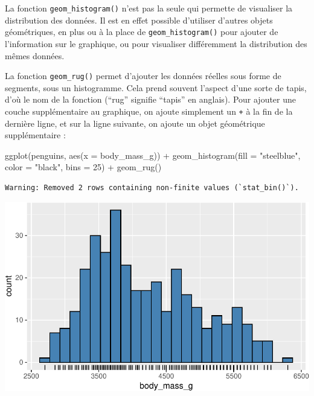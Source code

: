 \documentclass[
  a4paper,
  DIV=11,
  numbers=noendperiod,
  oneside]{scrreprt}
\newenvironment{Shaded}{}{}
\newcommand{\AttributeTok}[1]{\textcolor[rgb]{0.84,0.23,0.29}{#1}}
\newcommand{\DecValTok}[1]{\textcolor[rgb]{0.00,0.36,0.77}{#1}}
\newcommand{\FunctionTok}[1]{\textcolor[rgb]{0.44,0.26,0.76}{#1}}
\newcommand{\NormalTok}[1]{\textcolor[rgb]{0.14,0.16,0.18}{#1}}
\newcommand{\SpecialCharTok}[1]{\textcolor[rgb]{0.00,0.36,0.77}{#1}}
\newcommand{\StringTok}[1]{\textcolor[rgb]{0.01,0.18,0.38}{#1}}
\begin{document}
La fonction \texttt{geom\_histogram()} n'est pas la seule qui permette
de visualiser la distribution des données. Il est en effet possible
d'utiliser d'autres objets géométriques, en plus ou à la place de
\texttt{geom\_histogram()} pour ajouter de l'information sur le
graphique, ou pour visualiser différemment la distribution des mêmes
données.

La fonction \texttt{geom\_rug()} permet d'ajouter les données réelles
sous forme de segments, sous un histogramme. Cela prend souvent l'aspect
d'une sorte de tapis, d'où le nom de la fonction (``rug'' signifie
``tapis'' en anglais). Pour ajouter une couche supplémentaire au
graphique, on ajoute simplement un \texttt{+} à la fin de la dernière
ligne, et sur la ligne suivante, on ajoute un objet géométrique
supplémentaire :

\begin{Shaded}
\begin{Highlighting}[]
\FunctionTok{ggplot}\NormalTok{(penguins, }\FunctionTok{aes}\NormalTok{(}\AttributeTok{x =}\NormalTok{ body\_mass\_g)) }\SpecialCharTok{+}
  \FunctionTok{geom\_histogram}\NormalTok{(}\AttributeTok{fill =} \StringTok{"steelblue"}\NormalTok{, }\AttributeTok{color =} \StringTok{"black"}\NormalTok{,}
                 \AttributeTok{bins =} \DecValTok{25}\NormalTok{) }\SpecialCharTok{+}
  \FunctionTok{geom\_rug}\NormalTok{()}
\end{Highlighting}
\end{Shaded}

\begin{verbatim}
Warning: Removed 2 rows containing non-finite values (`stat_bin()`).
\end{verbatim}

\includegraphics{03-visualization_files/figure-pdf/unnamed-chunk-20-1.pdf}
\end{document}
